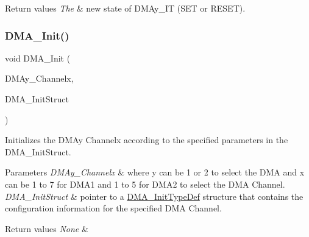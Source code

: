 \begin{DoxyRetVals}{Return values}
{\em The} & new state of D\+M\+Ay\+\_\+\+IT (S\+ET or R\+E\+S\+ET). \\
\hline
\end{DoxyRetVals}
\mbox{\label{group___d_m_a___exported___functions_ga7c3d1b9dc041f8e5f2cfc8d5dd858278}} 
\subsubsection{\texorpdfstring{DMA\_Init()}{DMA\_Init()}}
{\footnotesize\ttfamily void D\+M\+A\+\_\+\+Init (\begin{DoxyParamCaption}\item[{\mbox{\hyperlink{struct_d_m_a___channel___type_def}{D\+M\+A\+\_\+\+Channel\+\_\+\+Type\+Def}} $\ast$}]{D\+M\+Ay\+\_\+\+Channelx,  }\item[{\mbox{\hyperlink{struct_d_m_a___init_type_def}{D\+M\+A\+\_\+\+Init\+Type\+Def}} $\ast$}]{D\+M\+A\+\_\+\+Init\+Struct }\end{DoxyParamCaption})}



Initializes the D\+M\+Ay Channelx according to the specified parameters in the D\+M\+A\+\_\+\+Init\+Struct. 


\begin{DoxyParams}{Parameters}
{\em D\+M\+Ay\+\_\+\+Channelx} & where y can be 1 or 2 to select the D\+MA and x can be 1 to 7 for D\+M\+A1 and 1 to 5 for D\+M\+A2 to select the D\+MA Channel. \\
\hline
{\em D\+M\+A\+\_\+\+Init\+Struct} & pointer to a \mbox{\hyperlink{struct_d_m_a___init_type_def}{D\+M\+A\+\_\+\+Init\+Type\+Def}} structure that contains the configuration information for the specified D\+MA Channel. \\
\hline
\end{DoxyParams}

\begin{DoxyRetVals}{Return values}
{\em None} & \\
\hline
\end{DoxyRetVals}
\mbox{\label{group___d_m_a___exported___functions_ga0bb60360be9cd57f96399be2f3b5eb2b}} 
